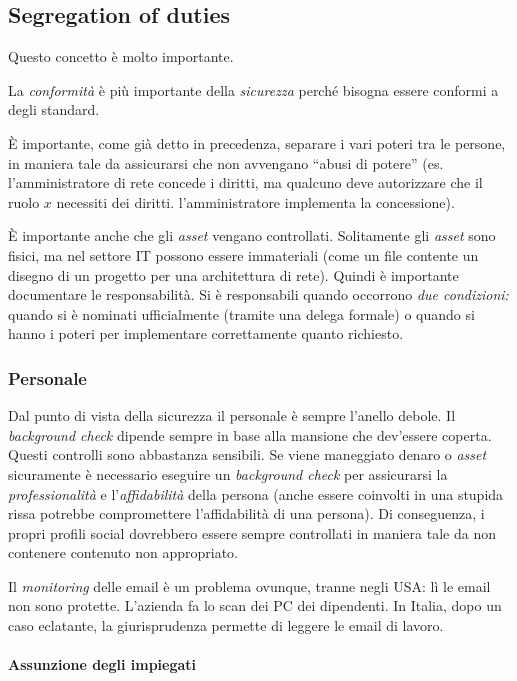 \subsection{Segregation of duties}

Questo concetto è molto importante.

La \textit{conformità} è più importante della \textit{sicurezza} perché bisogna
essere conformi a degli standard.

È importante, come già detto in precedenza, separare i vari
poteri tra le persone, in maniera tale da assicurarsi che non avvengano ``abusi
di potere'' (es. l'amministratore di rete concede i diritti, ma qualcuno deve autorizzare che il
ruolo $x$ necessiti dei diritti. l'amministratore implementa la concessione).

È importante anche che gli \textit{asset} vengano controllati. Solitamente gli
\textit{asset} sono fisici, ma nel settore IT possono essere immateriali (come
un file contente un disegno di un progetto per una architettura di rete). Quindi
è importante documentare le responsabilità. Si è responsabili quando occorrono
\textit{due condizioni:} quando si è nominati ufficialmente (tramite una delega formale) o
quando si hanno i poteri per implementare correttamente quanto richiesto.

\subsubsection{Personale}

Dal punto di vista della sicurezza il personale è sempre l'anello debole.
Il \textit{background check} dipende sempre in base alla mansione che
dev'essere coperta. Questi controlli sono abbastanza sensibili.
Se viene maneggiato denaro o \textit{asset} sicuramente è necessario eseguire
un \textit{background check} per assicurarsi la \textit{professionalità} e
l'\textit{affidabilità} della persona (anche essere coinvolti in una stupida
rissa potrebbe compromettere l'affidabilità di una persona). Di conseguenza, i propri
profili social dovrebbero essere sempre controllati in maniera
tale da non contenere contenuto non appropriato.

Il \textit{monitoring} delle email è un problema ovunque, tranne negli USA:
lì le email non sono protette. L'azienda fa lo scan dei PC dei
dipendenti. In Italia, dopo un caso eclatante, la giurisprudenza permette di
leggere le email di lavoro.

\paragraph{Assunzione degli impiegati}

